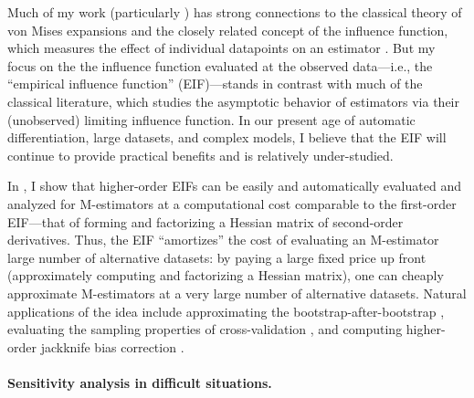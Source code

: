 Much of my work (particularly \citet{giordano:2019:ij, giordano:2020:amip,
giordano:2021:bayesij}) has strong connections to the classical theory of von
Mises expansions and the closely related concept of the influence function,
which measures the effect of individual datapoints on an estimator
\citep{mises:1947:asymptotic, reeds:1976:thesis, hampel:1986:robustbook,
serfling:2009:approximation}.  But my focus on the the influence function
evaluated at the observed data---i.e., the ``empirical influence function''
(EIF)---stands in contrast with much of the classical literature, which studies
the asymptotic behavior of estimators via their (unobserved) limiting influence
function.
%
In our present age of automatic differentiation, large datasets, and complex
models, I believe that the EIF will continue to provide practical benefits and
is relatively under-studied.

In \citet{giordano:2019:hoij}, I show that higher-order EIFs can be
easily and automatically evaluated and analyzed for M-estimators at a
computational cost comparable to the first-order EIF---that of forming and
factorizing a Hessian matrix of second-order derivatives.
%
Thus, the EIF ``amortizes'' the cost of evaluating an M-estimator large number
of alternative datasets: by paying a large fixed price up front (approximately
computing and factorizing a Hessian matrix), one can cheaply approximate
M-estimators at a very large number of alternative datasets.  Natural
applications of the idea include approximating the bootstrap-after-bootstrap
\citep{hall:2013:bootstrap}, evaluating the sampling properties of
cross-validation \citep{bayle:2020:cv}, and computing higher-order jackknife
bias correction \citep{shao:2012:jackknife}.

\paragraph{Sensitivity analysis in difficult situations.}

